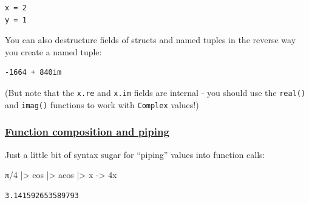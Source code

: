 \documentclass[
]{article}
\newenvironment{Shaded}{\begin{snugshade}}{\end{snugshade}}
\newcommand{\ConstantTok}[1]{\textcolor[rgb]{0.56,0.35,0.01}{#1}}
\newcommand{\DataTypeTok}[1]{\textcolor[rgb]{0.68,0.00,0.00}{#1}}
\newcommand{\FloatTok}[1]{\textcolor[rgb]{0.68,0.00,0.00}{#1}}
\newcommand{\FunctionTok}[1]{\textcolor[rgb]{0.28,0.35,0.67}{#1}}
\newcommand{\KeywordTok}[1]{\textcolor[rgb]{0.00,0.23,0.31}{\textbf{#1}}}
\newcommand{\NormalTok}[1]{\textcolor[rgb]{0.00,0.23,0.31}{#1}}
\newcommand{\OperatorTok}[1]{\textcolor[rgb]{0.37,0.37,0.37}{#1}}
\newcommand{\SpecialCharTok}[1]{\textcolor[rgb]{0.37,0.37,0.37}{#1}}
\newcommand{\StringTok}[1]{\textcolor[rgb]{0.13,0.47,0.30}{#1}}
\begin{document}
\begin{verbatim}
x = 2
y = 1
\end{verbatim}

You can also destructure fields of structs and named tuples in the
reverse way you create a named tuple:

\begin{Shaded}
\end{Shaded}

\begin{verbatim}
-1664 + 840im
\end{verbatim}

(But note that the \texttt{x.re} and \texttt{x.im} fields are internal -
you should use the \texttt{real()} and \texttt{imag()} functions to work
with \texttt{Complex} values!)

\subsubsection{\texorpdfstring{\href{https://docs.julialang.org/en/v1/manual/functions/\#Function-composition-and-piping}{Function
composition and
piping}}{Function composition and piping}}\label{function-composition-and-piping}

Just a little bit of syntax sugar for ``piping'' values into function
calls:

\begin{Shaded}
\begin{Highlighting}[]
\ConstantTok{π}\OperatorTok{/}\FloatTok{4} \OperatorTok{|\textgreater{}}\NormalTok{ cos }\OperatorTok{|\textgreater{}}\NormalTok{ acos }\OperatorTok{|\textgreater{}}\NormalTok{ x }\OperatorTok{{-}\textgreater{}} \FloatTok{4}\NormalTok{x}
\end{Highlighting}
\end{Shaded}

\begin{verbatim}
3.141592653589793
\end{verbatim}
\end{document}
